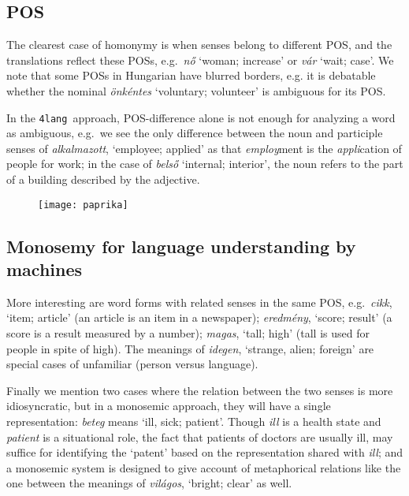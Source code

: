 \documentclass[11pt]{article}
\newcommand{\fl}{\texttt{4lang}}
\newcommand{\paprika}{
\begin{figure}
\texttt{[image: paprika]}
\end{figure}
}
\begin{document}
\subsection{POS}

The clearest case of homonymy is when senses belong to different POS, and the
translations reflect these POSs, e.g.~\emph{nő} `woman; increase' or \emph{vár}
 `wait; case'.  We note that some POSs in Hungarian have
blurred borders, e.g.  it is debatable whether the nominal \emph{önkéntes}
`voluntary; volunteer' is ambiguous for its POS.

In the \fl~approach\cite{Kornai:2017,Kornai:2015a}, POS-difference alone is not
enough for analyzing a word as ambiguous, e.g.~we see the only difference
between the noun and participle senses of \emph{alkalmazott}, `employee;
applied' as that \emph{employ}ment is the \emph{appli}cation of people for
work; in the case of \emph{belső} `internal; interior', the noun refers to the
part of a building described by the adjective.

\paprika

\subsection{Monosemy for language understanding by machines}

More interesting are word forms with related senses in the same POS,
e.g.~\emph{cikk}, `item; article' (an article is an item in a newspaper);
\emph{eredmény}, `score; result' (a score is a result measured by a number);
\emph{magas}, `tall; high' (tall is used for people in spite of high).  The
meanings of \emph{idegen}, `strange, alien; foreign' are special cases of
unfamiliar (person versus language).

Finally we mention two cases where the relation between the two senses is
more idiosyncratic, but in a monosemic approach, they will have a single
representation: \emph{beteg} means `ill, sick; patient'. Though \emph{ill} is
a health state and \emph{patient} is a situational role, the fact that
patients of doctors are usually ill, may suffice for identifying the `patent'
based on the representation shared with \emph{ill}; and a monosemic system is designed
to give account of metaphorical relations like the one between the meanings
of \emph{világos}, `bright; clear' as well.


\todo{missing sense \\ édes [['sweetheart'], ['cute \\
  közvetlen [['informal'], ['casual}
\end{document}
